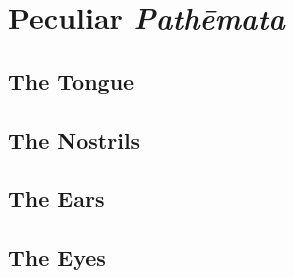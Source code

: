 


\section{Peculiar \emph{Pathēmata}} %
\label{sec:peculiar_emph_pathemata}

\subsection{The Tongue} %
\label{sub:the_tongue}




\subsection{The Nostrils} %
\label{sub:the_nostrils}




\subsection{The Ears} %
\label{sub:the_ears}




\subsection{The Eyes} %
\label{sub:the_eyes}






